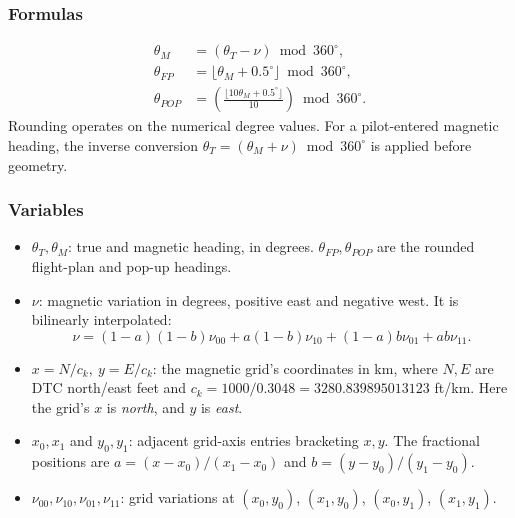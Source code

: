 \documentclass[10pt,a4paper]{amsart}
\begin{document}
\subsubsection*{Formulas}
\begin{align*}
 \theta_M&=(\theta_T-\nu)\bmod360^\circ,\\
 \theta_{FP}&=\lfloor\theta_M+0.5^\circ\rfloor\bmod360^\circ,\\
 \theta_{POP}&=\left(\frac{\lfloor10\theta_M+0.5^\circ\rfloor}{10}\right)
                  \bmod360^\circ.
\end{align*}
Rounding operates on the numerical degree values.
For a pilot-entered magnetic heading, the inverse conversion
$\theta_T=(\theta_M+\nu)\bmod360^\circ$ is applied before geometry.

\subsubsection*{Variables}
\begin{itemize}
\setlength{\itemsep}{0pt}
\setlength{\parsep}{0pt}
\item $\theta_T,\theta_M$: true and magnetic heading, in degrees.
$\theta_{FP},\theta_{POP}$ are the rounded flight-plan and pop-up
headings.
\item $\nu$: magnetic variation in degrees, positive east and negative
west. It is bilinearly interpolated:
\[
 \nu=(1-a)(1-b)\nu_{00}+a(1-b)\nu_{10}
       +(1-a)b\nu_{01}+ab\nu_{11}.
\]
\item $x=N/c_k,\ y=E/c_k$: the magnetic grid's coordinates in km,
where $N,E$ are DTC north/east feet and
$c_k=1000/0.3048=3280.839895013123$ ft/km.
Here the grid's $x$ is \emph{north}, and $y$ is \emph{east}.
\item $x_0,x_1$ and $y_0,y_1$: adjacent grid-axis entries bracketing
$x,y$. The fractional positions are
$a=(x-x_0)/(x_1-x_0)$ and $b=(y-y_0)/(y_1-y_0)$.
\item $\nu_{00},\nu_{10},\nu_{01},\nu_{11}$: grid variations at
$(x_0,y_0)$, $(x_1,y_0)$, $(x_0,y_1)$, $(x_1,y_1)$.
\end{itemize}
\end{document}
